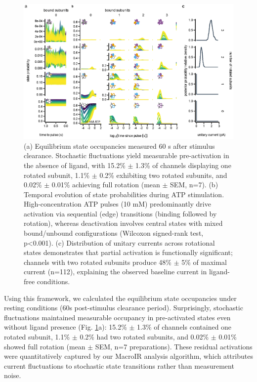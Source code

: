 \documentclass[pdflatex,sn-mathphys-num]{sn-jnl}%
\theoremstyle{thmstyleone}%
\theoremstyle{thmstyletwo}%
\theoremstyle{thmstylethree}%
\begin{document}
\begin{figure}[t]
	\centering
	\includegraphics[width=\linewidth]{Figure_5_states.pdf}
	\caption{(a) Equilibrium state occupancies measured 60 s after stimulus clearance. Stochastic fluctuations yield measurable pre-activation in the absence of ligand, with 15.2\% $\pm$ 1.3\% of channels displaying one rotated subunit, 1.1\% $\pm$ 0.2\% exhibiting two rotated subunits, and 0.02\% $\pm$ 0.01\% achieving full rotation (mean $\pm$ SEM, n=7). (b) Temporal evolution of state probabilities during ATP stimulation. High-concentration ATP pulses (10 mM) predominantly drive activation via sequential (edge) transitions (binding followed by rotation), whereas deactivation involves central states with mixed bound/unbound configurations (Wilcoxon signed-rank test, p<0.001). (c) Distribution of unitary currents across rotational states demonstrates that partial activation is functionally significant; channels with two rotated subunits produce 48\% $\pm$ 5\% of maximal current (n=112), explaining the observed baseline current in ligand-free conditions.}
	\label{fig:SchemeX_states}
\end{figure}


Using this framework, we calculated the equilibrium state occupancies under resting conditions (60s post-stimulus clearance period). Surprisingly, stochastic fluctuations maintained measurable occupancy in pre-activated states even without ligand presence (Fig. \ref{fig:SchemeX_states}a): 15.2\% $\pm$ 1.3\% of channels contained one rotated subunit, 1.1\% $\pm$ 0.2\% had two rotated subunits, and 0.02\% $\pm$ 0.01\% showed full rotation (mean $\pm$ SEM, n=7 preparations). These residual activations were quantitatively captured by our MacroIR analysis algorithm, which attributes current fluctuations to stochastic state transitions rather than measurement noise.
\end{document}
